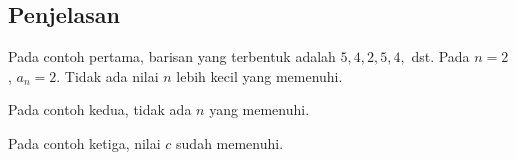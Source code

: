 \documentclass{article}
\begin{document}
\subsection*{Penjelasan}

\par\noindent Pada contoh pertama, barisan yang terbentuk adalah $5, 4, 2, 5, 4,$ dst. Pada $n = 2$, $a_n = 2$. Tidak ada nilai $n$ lebih kecil yang memenuhi.

\par\noindent Pada contoh kedua, tidak ada $n$ yang memenuhi.

\par\noindent Pada contoh ketiga, nilai $c$ sudah memenuhi.
\end{document}
